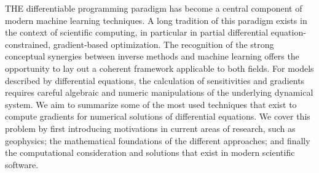 THE differentiable programming paradigm has become a central component of modern machine learning techniques. 
A long tradition of this paradigm exists in the context of scientific computing, in particular in partial differential equation-constrained, gradient-based optimization.
The recognition of the strong conceptual synergies between inverse methods and machine learning offers the opportunity to lay out a coherent framework applicable to both fields.
For models described by differential equations, the calculation of sensitivities and gradients requires careful algebraic and numeric manipulations of the underlying dynamical system.
We aim to summarize some of the most used techniques that exist to compute gradients for numerical solutions of differential equations. 
We cover this problem by first introducing motivations in current areas of research, such as geophysics; the mathematical foundations of the different approaches; and finally the computational consideration and solutions that exist in modern scientific software. 
